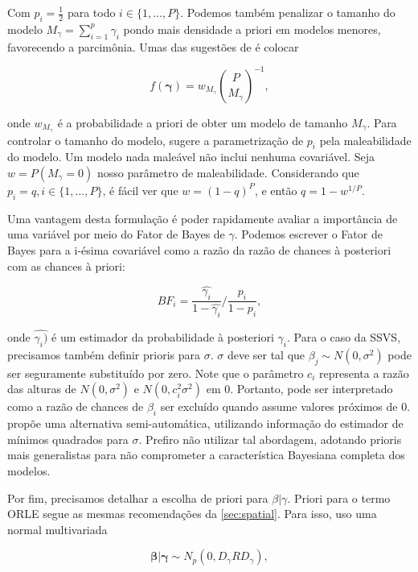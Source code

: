 Com $p_i = \frac{1}{2}$ para todo $i \in \{1,\dots,P\}$. Podemos também penalizar o tamanho do modelo $M_{\gamma} = \sum_{i=1}^{p} \gamma_i$  pondo mais densidade a priori em modelos menores, favorecendo a parcimônia. Umas das sugestões de \cite{McCulloch1993} é colocar

\begin{equation}
    f(\boldsymbol{\gamma}) = w_{M_{\gamma}} \binom{P}{M_{\gamma}}^{-1},
\end{equation}

onde $w_{M_{\gamma}}$ é a probabilidade a priori de obter um modelo de tamanho $M_{\gamma}$. Para controlar o tamanho do modelo, \cite{Carvalho2019} sugere a parametrização de $p_i$ pela maleabilidade do modelo. Um modelo nada maleável não inclui nenhuma covariável. Seja $w = P(M_{\gamma} = 0)$ nosso parâmetro de maleabilidade. Considerando que $p_i = q, i \in \{1,\dots, P\}$, é fácil ver que $w = (1-q)^P$, e então $q = 1 - w^{1/P}$.

Uma vantagem desta formulação é poder rapidamente avaliar a importância de uma variável por meio do Fator de Bayes de $\gamma$. Podemos escrever o Fator de Bayes para a i-ésima covariável como a razão da razão de chances à posteriori com as chances à priori:

\begin{equation}\label{eq: BF}
BF_i = \frac{\hat{\gamma_i}}{1 - \hat{\gamma_i}}/\frac{p_i}{1-p_i},
\end{equation}

onde $\hat{\gamma_i)}$ é um estimador da probabilidade à posteriori $\gamma_i$.
Para o caso da SSVS, precisamos também definir prioris para $\sigma$. $\sigma$ deve ser tal que $\beta_j \sim N(0,\sigma^2)$ pode ser seguramente substituído por zero. Note que o parâmetro $c_i$ representa a razão das alturas de $N(0,\sigma^2)$ e $N(0,c_i^2\sigma^2)$ em 0. Portanto, pode ser interpretado como a razão de chances de $\beta_i$ ser excluído quando assume valores próximos de 0.  \cite{McCulloch1993} propõe uma alternativa semi-automática, utilizando informação do estimador de mínimos quadrados para $\sigma$. Prefiro não utilizar tal abordagem, adotando prioris mais generalistas para não comprometer a característica Bayesiana completa dos modelos. 

Por fim, precisamos detalhar a escolha de priori para $\beta|\gamma$. Priori para o termo ORLE segue as mesmas recomendações da \autoref{sec:spatial}. Para isso, uso uma normal multivariada

\begin{equation}\label{eq:beta_prior}
    \boldsymbol{\beta}|\boldsymbol{\gamma} \sim N_p(0, D_{\gamma}RD_{\gamma}),
\end{equation}

